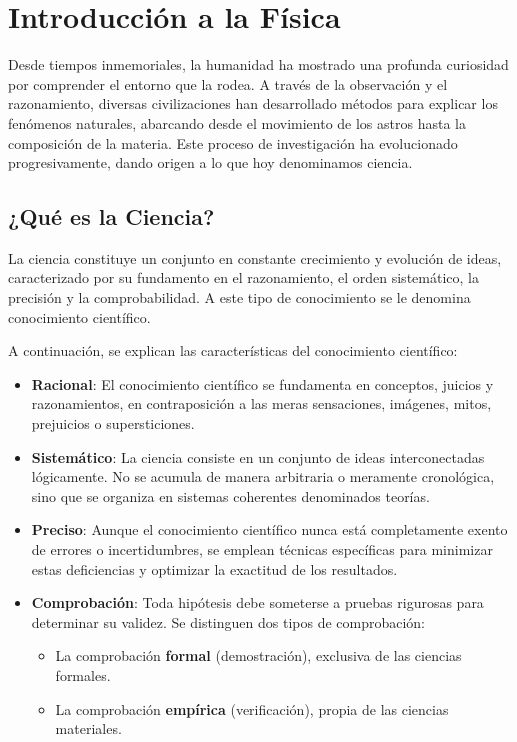 \section{Introducción a la Física}

Desde tiempos inmemoriales, la humanidad ha mostrado una profunda curiosidad por comprender el entorno que la rodea. A través de la observación y el razonamiento, diversas civilizaciones han desarrollado métodos para explicar los fenómenos naturales, abarcando desde el movimiento de los astros hasta la composición de la materia. Este proceso de investigación ha evolucionado progresivamente, dando origen a lo que hoy denominamos ciencia.

\subsection{¿Qué es la Ciencia?}

La ciencia constituye un conjunto en constante crecimiento y evolución de ideas, caracterizado por su fundamento en el razonamiento, el orden sistemático, la precisión y la comprobabilidad. A este tipo de conocimiento se le denomina conocimiento científico.

A continuación, se explican las características del conocimiento científico:
\begin{itemize}
    \item \textbf{Racional}: El conocimiento científico se fundamenta en conceptos, juicios y razonamientos, en contraposición a las meras sensaciones, imágenes, mitos, prejuicios o supersticiones.
    \item \textbf{Sistemático}: La ciencia consiste en un conjunto de ideas interconectadas lógicamente. No se acumula de manera arbitraria o meramente cronológica, sino que se organiza en sistemas coherentes denominados teorías.
    \item \textbf{Preciso}: Aunque el conocimiento científico nunca está completamente exento de errores o incertidumbres, se emplean técnicas específicas para minimizar estas deficiencias y optimizar la exactitud de los resultados.
    \item \textbf{Comprobación}: Toda hipótesis debe someterse a pruebas rigurosas para determinar su validez. Se distinguen dos tipos de comprobación:
    \begin{itemize}
        \item La comprobación \textbf{formal} (demostración), exclusiva de las ciencias formales.
        \item La comprobación \textbf{empírica} (verificación), propia de las ciencias materiales.
    \end{itemize}
\end{itemize}

